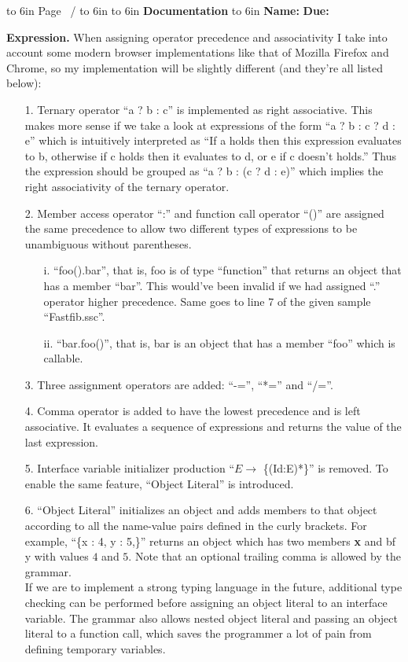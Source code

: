 \documentclass[12pt]{article}
\newcommand{\header}[1]
{
    \begin{center}
    \framebox
    {
        \vbox
        {
            \hbox to 6in {{\bf \CourseName}  \hfill Page \thepage\ / \pageref{LastPage}}
            \vspace{4mm}
            \hbox to 6in {{\hfill \AssignmentType \Number \hfill}}
            \vspace{4mm}
            \hbox to 6in {{\Large \hfill {\bf #1} \hfill}}
            \vspace{4mm}
            \hbox to 6in {{\bf Name:} \Student \space {\bf No.} \NetID \hfill {\bf Due:} \Due}
        }
    }
    \end{center}
}
\begin{document}
\header{Documentation}
\vspace{4mm}
{\bf Expression.} When assigning operator precedence and associativity I take into
account some modern browser implementations like that of Mozilla Firefox and Chrome, so
my implementation will be slightly different (and they're all listed below):

\begin{itemize}
\item[1.] Ternary operator ``a ? b : c'' is implemented as right associative. This makes
  more sense if we take a look at expressions of the form ``a ? b : c ? d : e'' which is
  intuitively interpreted as ``If a holds then this expression evaluates to b, otherwise
  if c holds then it evaluates to d, or e if c doesn't holds.'' Thus the expression should
  be grouped as ``a ? b : (c ? d : e)'' which implies the right associativity of the
  ternary operator.
\item[2.] Member access operator ``:'' and function call operator ``()'' are assigned the
  same precedence to allow two different types of expressions to be unambiguous without
  parentheses.
  \begin{itemize}
  \item[i.] ``foo().bar'', that is, foo is of type ``function'' that returns an object that
    has a member ``bar''. This would've been invalid if we had assigned ``.'' operator higher
    precedence. Same goes to line 7 of the given sample ``Fastfib.ssc''.
  \item[ii.] ``bar.foo()'', that is, bar is an object that has a member ``foo'' which is
    callable.
  \end{itemize}
\item[3.] Three assignment operators are added: ``-='', ``*='' and ``/=''.
\item[4.] Comma operator is added to have the lowest precedence and is left associative.
  It evaluates a sequence of expressions and returns the value of the last expression.
\item[5.] Interface variable initializer production ``$E \rightarrow$ \{(Id:E)*\}'' is
  removed. To enable the same feature, ``Object Literal'' is introduced.
\item[6.] ``Object Literal'' initializes an object and adds members to that object according
  to all the name-value pairs defined in the curly brackets. For example, ``\{x : 4, y : 5,\}''
  returns an object which has two members {\bf x} and {bf y} with values $4$ and $5$. Note that
  an optional trailing comma is allowed by the grammar.\\
  If we are to implement a strong typing language in the future, additional type checking can
  be performed before assigning an object literal to an interface variable. The grammar also
  allows nested object literal and passing an object literal to a function call, which saves
  the programmer a lot of pain from defining temporary variables.
\end{itemize}
\end{document}
